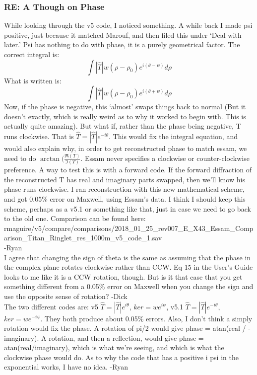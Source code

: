 \documentclass[crop=false,class=book]{standalone}
\begin{document}
\subsubsection{\footnotesize RE: A Though on Phase}
While looking through the v5 code, I noticed something. A while back I made psi positive, just because it matched Marouf, and then filed this under ‘Deal with later.’ Psi has nothing to do with phase, it is a purely geometrical factor. The correct integral is:
\begin{equation*}
    \int|\hat{T}|w(\rho-\rho_{0})e^{i(\theta-\psi)}d\rho
\end{equation*}
What is written is:
\begin{equation*}
    \int|\hat{T}|w(\rho-\rho_{0})e^{i(\theta+\psi)}d\rho
\end{equation*}
Now, if the phase is negative, this ‘almost’ swaps things back to normal (But it doesn’t exactly, which is really weird as to why it worked to begin with. This is actually quite amazing). But what if, rather than the phase being negative, T runs clockwise. That is $\hat{T}=|\hat{T}|e^{-i\theta}$. This would fix the integral equation, and would also explain why, in order to get reconstructed phase to match essam, we need to do $\arctan(\frac{\Re(T)}{\Im(T)}$. Essam never specifies a clockwise or counter-clockwise preference. A way to test this is with a forward code. If the forward diffraction of the reconstructed T has real and imaginary parts swapped, then we'll know his phase runs clockwise. I ran reconstruction with this new mathematical scheme, and got 0.05\% error on Maxwell, using Essam's data. I think I should keep this scheme, perhaps as a v5.1 or something like that, just in case we need to go back to the old one. Comparison can be found here:\\
rmaguire/v5/compare/comparisons/2018\_01\_25\_rev007\_E\_X43\_Essam\_Comparison\_Titan\_Ringlet\_res\_1000m\_v5\_code\_1.sav\\
-Ryan\\
I agree that changing the sign of theta is the same as assuming that the phase in the complex plane rotates clockwise rather than CCW. Eq 15 in the User's Guide looks to me like it is a CCW rotation, though. But is it that case that you get something different from a 0.05\% error on Maxwell when you change the sign and use the opposite sense of rotation? -Dick\\
The two different codes are: v5 $\hat{T}=|\hat{T}|e^{i\theta}$, $ker=we^{i\psi}$, v5.1 $\hat{T}=|\hat{T}|e^{-i\theta}$, $ker=we^{-i\psi}$. They both produce about 0.05\% errors. Also, I don't think a simply rotation would fix the phase. A rotation of pi/2 would give phase = atan(real / -imaginary). A rotation, and then a reflection, would give phase = atan(real/imaginary), which is what we're seeing, and which is what the clockwise phase would do. As to why the code that has a positive i psi in the exponential works, I have no idea. -Ryan
\end{document}
